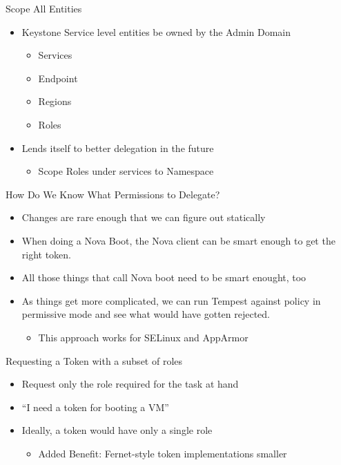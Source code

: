 \documentclass{beamer}
\begin{document}
\begin{frame}{Scope All Entities}
  \begin{itemize}
  \item Keystone Service level entities be owned by the Admin Domain
    \begin{itemize}
    \item Services
    \item Endpoint
    \item Regions
    \item Roles
    \end{itemize}
  \item Lends itself to better delegation in the future
    \begin{itemize}
    \item Scope Roles under services to Namespace
    \end{itemize}
  \end{itemize}
\end{frame}





\begin{frame}{How Do We Know What Permissions to Delegate?}
  \begin{itemize}
  \item Changes are rare enough that we can figure out statically
  \item When doing a Nova Boot, the Nova client can be smart enough to get the right token.
  \item All those things that call Nova boot need to be smart enought, too
  \item As things get more complicated, we can run Tempest against policy in permissive mode and see what would have gotten rejected.
    \begin{itemize}
    \item This approach works for SELinux and AppArmor
    \end{itemize}
  \end{itemize}
\end{frame}

\begin{frame}{Requesting a Token with a subset 	of roles}
  \begin{itemize}
  \item Request only the role required for the task at hand
  \item ``I need a token for booting a VM''
  \item Ideally, a token would have only a single role
    \begin{itemize}
    \item Added Benefit: Fernet-style token implementations smaller
    \end{itemize}
  \end{itemize}
\end{frame}
\end{document}
